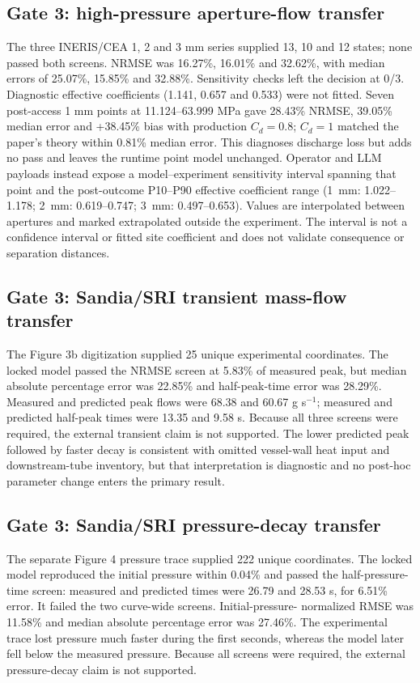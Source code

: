 \documentclass[12pt,a4paper]{article}
\begin{document}
\subsection{Gate 3: high-pressure aperture-flow transfer}
The three INERIS/CEA 1, 2 and 3 mm series supplied 13, 10 and 12 states; none
passed both screens. NRMSE was 16.27\%, 16.01\% and 32.62\%, with median errors
of 25.07\%, 15.85\% and 32.88\%. Sensitivity checks left the decision at 0/3.
Diagnostic effective coefficients (1.141, 0.657 and 0.533) were not fitted.
Seven post-access 1 mm points at 11.124--63.999 MPa \cite{liang2026} gave
28.43\% NRMSE, 39.05\% median error and +38.45\% bias with production
$C_d=0.8$; $C_d=1$ matched the paper's theory within 0.81\% median error. This
diagnoses discharge loss but adds no pass and leaves the runtime point model
unchanged. Operator and LLM payloads instead expose a model--experiment
sensitivity interval spanning that point and the post-outcome P10--P90 effective
coefficient range (1~mm: 1.022--1.178; 2~mm: 0.619--0.747; 3~mm:
0.497--0.653). Values are interpolated between apertures and marked extrapolated
outside the experiment. The interval is not a confidence interval or fitted site
coefficient and does not validate consequence or separation distances.

\subsection{Gate 3: Sandia/SRI transient mass-flow transfer}
The Figure 3b digitization supplied 25 unique experimental coordinates. The
locked model passed the NRMSE screen at 5.83\% of measured peak, but median
absolute percentage error was 22.85\% and half-peak-time error was 28.29\%.
Measured and predicted peak flows were 68.38 and 60.67 g s$^{-1}$; measured and
predicted half-peak times were 13.35 and 9.58 s. Because all three screens were
required, the external transient claim is not supported. The lower predicted
peak followed by faster decay is consistent with omitted vessel-wall heat input
and downstream-tube inventory, but that interpretation is diagnostic and no
post-hoc parameter change enters the primary result.

\subsection{Gate 3: Sandia/SRI pressure-decay transfer}
The separate Figure 4 pressure trace supplied 222 unique coordinates. The
locked model reproduced the initial pressure within 0.04\% and passed the
half-pressure-time screen: measured and predicted times were 26.79 and 28.53 s,
for 6.51\% error. It failed the two curve-wide screens. Initial-pressure-
normalized RMSE was 11.58\% and median absolute percentage error was 27.46\%.
The experimental trace lost pressure much faster during the first seconds,
whereas the model later fell below the measured pressure. Because all screens
were required, the external pressure-decay claim is not supported.
\end{document}
